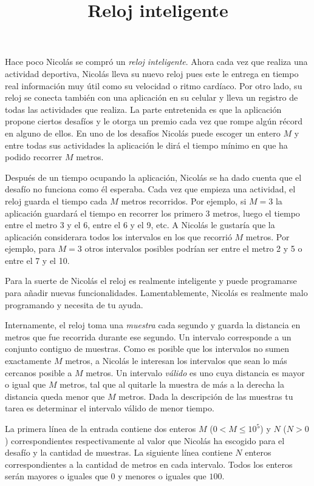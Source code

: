 \documentclass{oci}
\title{Reloj inteligente}
\begin{document}
\begin{problemDescription}
  Hace poco Nicolás se compró un \emph{reloj inteligente}.
  Ahora cada vez que realiza una actividad deportiva, Nicolás lleva su nuevo
  reloj pues este le entrega en tiempo real información muy útil como su
  velocidad o ritmo cardíaco.
  Por otro lado, su reloj se conecta también con una aplicación en su celular y
  lleva un registro de todas las actividades que realiza.
  La parte entretenida es que la aplicación propone ciertos desafíos y le otorga
  un premio cada vez que rompe algún récord en alguno de ellos.
  En uno de los desafíos Nicolás puede escoger un entero $M$ y entre todas sus
  actividades la aplicación le dirá el tiempo mínimo en que ha podido recorrer
  $M$ metros.

  Después de un tiempo ocupando la aplicación, Nicolás se ha dado cuenta que el
  desafío no funciona como él esperaba.
  Cada vez que empieza una actividad, el reloj guarda el tiempo cada $M$
  metros recorridos.
  Por ejemplo, si $M=3$ la aplicación guardará el tiempo en
  recorrer los primero 3 metros, luego el tiempo entre el metro 3 y
  el 6, entre el 6 y el 9, etc.
  A Nicolás le gustaría que la aplicación considerara todos los intervalos en
  los que recorrió $M$ metros.
  Por ejemplo, para $M=3$ otros intervalos posibles podrían ser entre el
  metro 2 y 5 o entre el 7 y el 10.

  Para la suerte de Nicolás el reloj es realmente inteligente y puede
  programarse para añadir nuevas funcionalidades.
  Lamentablemente, Nicolás es realmente malo programando y necesita de tu ayuda.

  Internamente, el reloj toma una \emph{muestra} cada segundo y guarda la
  distancia en metros que fue recorrida durante ese segundo.
  Un intervalo corresponde a un conjunto contiguo de muestras.
  Como es posible que los intervalos no sumen exactamente $M$ metros, a
  Nicolás le interesan los intervalos que sean lo más cercanos posible a $M$
  metros.
  Un intervalo \emph{válido} es uno cuya distancia es mayor o igual que $M$ metros,
  tal que al quitarle la muestra de más a la derecha la distancia queda menor
  que $M$ metros.
  Dada la descripción de las muestras tu tarea es determinar el intervalo
  válido de menor tiempo.

\end{problemDescription}

\begin{inputDescription}
  La primera línea de la entrada contiene dos enteros $M$ ($0<M\leq 10^5$) y $N$
  ($N > 0$) correspondientes respectivamente al valor que Nicolás ha escogido
  para el desafío y la cantidad de muestras.
  La siguiente línea contiene $N$ enteros correspondientes a la cantidad de
  metros en cada intervalo.
  Todos los enteros serán mayores o iguales que 0 y menores o iguales que $100$.
\end{inputDescription}
\end{document}

